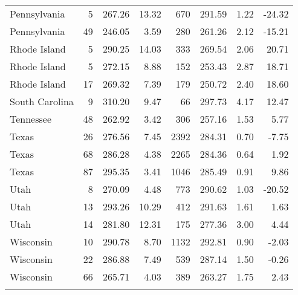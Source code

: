 \begin{longtable}{lrrr@{\extracolsep{10pt}}rrrr}
  Pennsylvania &   5 & 267.26 & 13.32 & 670 & 291.59 & 1.22 & -24.32 \\ 
  Pennsylvania &  49 & 246.05 & 3.59 & 280 & 261.26 & 2.12 & -15.21 \\ 
  Rhode Island &   5 & 290.25 & 14.03 & 333 & 269.54 & 2.06 & 20.71 \\ 
  Rhode Island &   5 & 272.15 & 8.88 & 152 & 253.43 & 2.87 & 18.71 \\ 
  Rhode Island &  17 & 269.32 & 7.39 & 179 & 250.72 & 2.40 & 18.60 \\ 
  South Carolina &   9 & 310.20 & 9.47 &  66 & 297.73 & 4.17 & 12.47 \\ 
  Tennessee &  48 & 262.92 & 3.42 & 306 & 257.16 & 1.53 & 5.77 \\ 
  Texas &  26 & 276.56 & 7.45 & 2392 & 284.31 & 0.70 & -7.75 \\ 
  Texas &  68 & 286.28 & 4.38 & 2265 & 284.36 & 0.64 & 1.92 \\ 
  Texas &  87 & 295.35 & 3.41 & 1046 & 285.49 & 0.91 & 9.86 \\ 
  Utah &   8 & 270.09 & 4.48 & 773 & 290.62 & 1.03 & -20.52 \\ 
  Utah &  13 & 293.26 & 10.29 & 412 & 291.63 & 1.61 & 1.63 \\ 
  Utah &  14 & 281.80 & 12.31 & 175 & 277.36 & 3.00 & 4.44 \\ 
  Wisconsin &  10 & 290.78 & 8.70 & 1132 & 292.81 & 0.90 & -2.03 \\ 
  Wisconsin &  22 & 286.88 & 7.49 & 539 & 287.14 & 1.50 & -0.26 \\ 
  Wisconsin &  66 & 265.71 & 4.03 & 389 & 263.27 & 1.75 & 2.43 \\ 
   \hline
\hline
\label{g8mathlrlevel1}
\end{longtable}
